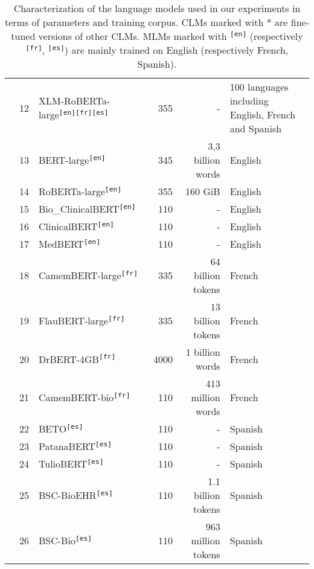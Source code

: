 \begin{table}[ht]
{\begin{tabular}{cllrrl}
 & 12 & XLM-RoBERTa-large\textsuperscript{\texttt{[en]}}\textsuperscript{\texttt{[fr]}}\textsuperscript{\texttt{[es]}} \cite{conneau2020unsupervised} & 355 & - & 100 languages including English, French and Spanish \\
 & 13 & BERT-large\textsuperscript{\texttt{[en]}} \cite{devlin2019bert} & 345 & 3,3 billion words & English \\
 & 14 & RoBERTa-large\textsuperscript{\texttt{[en]}} \cite{liu2019roberta} & 355 & 160 GiB & English \\
 & 15 & Bio\_ClinicalBERT\textsuperscript{\texttt{[en]}} \cite{alsentzer2019publicly} & 110 & - & English \\
 & 16 & ClinicalBERT\textsuperscript{\texttt{[en]}} \cite{wang2023optimized} & 110 & - & English \\
 & 17 & MedBERT\textsuperscript{\texttt{[en]}} \cite{charangan2022medbert} & 110 & - & English \\
 & 18 & CamemBERT-large\textsuperscript{\texttt{[fr]}} \cite{martin2019camembert} & 335 & 64 billion tokens & French \\
 & 19 & FlauBERT-large\textsuperscript{\texttt{[fr]}} \cite{le2019flaubert} & 335 & 13 billion tokens & French \\
 & 20 & DrBERT-4GB\textsuperscript{\texttt{[fr]}} \cite{labrak2023drbert} & 4000 & 1 billion words & French \\
 & 21 & CamemBERT-bio\textsuperscript{\texttt{[fr]}} \cite{touchent2023camembertbio} & 110 & 413 million words & French \\
 & 22 & BETO\textsuperscript{\texttt{[es]}} \cite{canete2020beto} & 110 & - & Spanish \\
 & 23 & PatanaBERT\textsuperscript{\texttt{[es]}} & 110 & - & Spanish \\
 & 24 & TulioBERT\textsuperscript{\texttt{[es]}} & 110 & - & Spanish \\
 & 25 & BSC-BioEHR\textsuperscript{\texttt{[es]}} \cite{carrino2022pretrained} & 110 & 1.1 billion tokens & Spanish \\
 & 26 & BSC-Bio\textsuperscript{\texttt{[es]}} \cite{carrino2022pretrained} & 110 & 963 million tokens & Spanish \\
\bottomrule
\end{tabular}}
\caption{Characterization of the language models used in our experiments in terms of parameters and training corpus. CLMs marked with * are fine-tuned versions of other CLMs. MLMs marked with \textsuperscript{\texttt{[en]}} (respectively \textsuperscript{\texttt{[fr]}}, \textsuperscript{\texttt{[es]}}) are mainly trained on English (respectively French, Spanish).}
\label{tab:LM_features}
\end{table}
